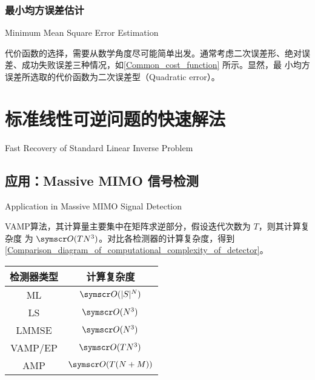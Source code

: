 \documentclass[type=master]{../gdutthesis}
\newcommand{\mscr}{\symscr}
\begin{document}
\subsection{最小均方误差估计}{Minimum Mean Square Error Estimation}

代价函数的选择，需要从数学角度尽可能简单出发。通常考虑二次误差形、绝对误
差、成功失败误差三种情况，如\autoref{Common_cost_function} 所示。显然，最
小均方误差所选取的代价函数为二次误差型（Quadratic error）。

\begin{figure}
  \quad
  \quad
  \label{Common_cost_function}
\end{figure}

\chapter{标准线性可逆问题的快速解法}{Fast Recovery of Standard Linear Inverse Problem}
\section{应用：Massive MIMO 信号检测}{Application in Massive MIMO Signal Detection}

VAMP算法，其计算量主要集中在矩阵求逆部分，假设迭代次数为 $T$，则其计算复杂度
为 $\mscr O(TN^3)$。对比各检测器的计算复杂度，得到\autoref{Comparison_diagram_of_computational_complexity_of_detector}。

\begin{table}
  \label{Comparison_diagram_of_computational_complexity_of_detector}
  \begin{tabular}{cc}
    \toprule
    检测器类型 & 计算复杂度 \\
    \midrule
    ML        & $\mscr O(|S|^N)$ \\
    LS        & $\mscr O(N^3)$   \\
    LMMSE     & $\mscr O(N^3)$   \\
    VAMP/EP   & $\mscr O(TN^3)$   \\
    AMP       & $\mscr O(T(N+M))$   \\
    \bottomrule
    \end{tabular}
\end{table}
\end{document}
